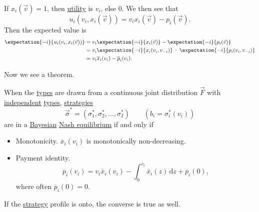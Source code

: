 If \(x_{i}(\vec{v})=1\), then \hyperref[def:reward]{utility}  is \(v_{i}\), else \(0\). We then see that
\[
	u_{i}(v_{i}, x_{i}(\vec{v})) = v_{i}x_{i}(\vec{v}) - p_{i}(\vec{v}).
\]
Then the expected value is
\[
	\begin{split}
		\expectation{-i}{u_{i}(v_{i}, x_{i}(\vec{v}))} &= v_{i} \expectation{-i}{x_{i}(\vec{v})} - \expectation{-i}{p_{i}(\vec{v})}\\
		&= v_{i} \expectation{-i}{x_{i}(v_{i}, v_{-i})} - \expectation{-i}{p_{i}(v_{i}, v_{-i})}\\
		&= v_{i} \overline{x}_{i}(v_{i})-\overline{p}_{i}(v_{i}).
	\end{split}
\]

Now we see a theorem.
\begin{theorem}\label{thm:Bayesian-Nash-equilibrium-characterization}
	When the \hyperref[def:type]{types} are drawn from a continuous joint distribution \(\vec{F}\) with \hyperref[def:independent]{independent} \hyperref[def:type]{types},
	\hyperref[def:strategy]{strategies}
	\[
		\vec{\sigma}^{\ast} = (\sigma^{\ast}_1, \sigma^{\ast}_2, \ldots , \sigma^{\ast}_I)\qquad (b_{i} = \sigma^{\ast}_{i}(v_{i}))
	\]
	are in a \hyperref[def:mathematical-Bayesian-game]{Bayesian} \hyperref[def:Nash-equilibrium]{Nash equilibrium} if and only if
	\begin{itemize}
		\item Monotonicity. \(\overline{x}_{i}(v_{i})\) is monotonically non-decreasing.
		\item Payment identity.
		      \[
			      \overline{p}_{i}(v_{i}) = v_{i}\overline{x}_{i}(v_{i}) - \int_0^{v_{i}} \overline{x}_{i}(z)\,\mathrm{d}z + \overline{p}_{i}(0),
		      \]
		      where often \(\overline{p}_{i}(0) = 0\).
	\end{itemize}
	If the \hyperref[def:strategy]{strategy} profile is onto, the converse is true as well.
\end{theorem}